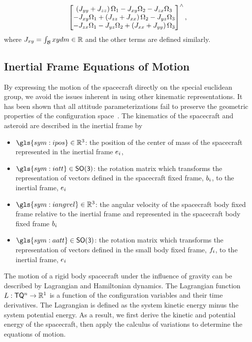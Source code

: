 \begin{align*}
    \begin{bmatrix}
        \left( J_{yy} + J_{zz} \right) \Omega_1 - J_{xy} \Omega_2 - J_{zx} \Omega_3 \\
        -J_{xy}\Omega_1 + \left( J_{zz} + J_{xx} \right) \Omega_2 - J_{yz}\Omega_3 \\
        -J_{zx}\Omega_1 - J_{yz}\Omega_2 + \left( J_{xx} + J_{yy} \right) \Omega_3
    \end{bmatrix}^\wedge,
\end{align*}
where \( J_{xy} = \int_{\mathcal{B}} xy dm \in \mathbb{R} \) and the other terms are defined similarly.

\subsection{Inertial Frame Equations of Motion}\label{sec:inertial_dumbbell_eoms}
By expressing the motion of the spacecraft directly on the special euclidean group, we avoid the issues inherent in using other kinematic representations.
It has been shown that all attitude parameterizations fail to preserve the geometric properties of the configuration space~\cite{chaturvedi2011a}.
The kinematics of the spacecraft and asteroid are described in the inertial frame by
\begin{itemize}
    \item \( \gls{sym:ipos} \in \R^3 \): the position of the center of mass of the spacecraft represented in the inertial frame \( e_{i} \),
    \item \( \gls{sym:iatt} \in \SO\): the rotation matrix which transforms the representation of vectors defined in the spacecraft fixed frame, \( b_{i} \), to the inertial frame, \( e_{i} \)
    \item \( \gls{sym:iangvel} \in \R^3 \): the angular velocity of the spacecraft body fixed frame relative to the inertial frame and represented in the spacecraft body fixed frame \( b_{i} \)
    \item \( \gls{sym:aatt} \in \SO \): the rotation matrix which transforms the representation of vectors defined in the small body fixed frame, \( f_{i} \), to the inertial frame, \( e_{i} \)
\end{itemize}

The motion of a rigid body spacecraft under the influence of gravity can be described by Lagrangian and Hamiltonian dynamics.
The Lagrangian function \( L : \mathsf{T} \mathsf{Q}^n \to \mathbb{R}^1 \) is a function of the configuration variables and their time derivatives.
The Lagrangian is defined as the system kinetic energy minus the system potential energy.
As a result, we first derive the kinetic and potential energy of the spacecraft, then apply the calculus of variations to determine the equations of motion.

